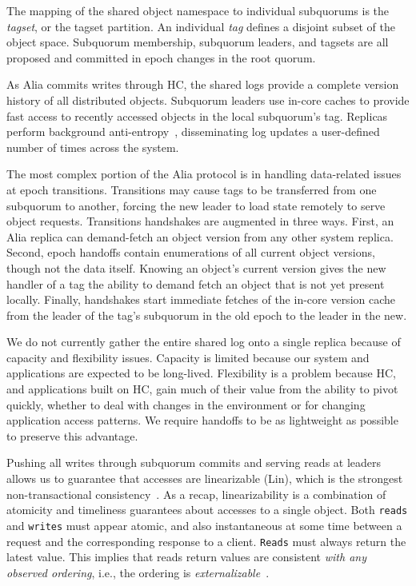 \documentclass[letterpaper,10pt,twocolumn]{article}
\newcommand{\sub}{subquorum\xspace}
\newcommand{\Sub}{Subquorum\xspace}
\newcommand{\subs}{subquorums\xspace}
\newcommand{\sys}{Alia\xspace}
\newcommand{\roo}{root quorum\xspace}
\begin{document}
The mapping of the shared object namespace to individual \subs is the
\emph{tagset}, or the tagset partition.
An individual \emph{tag} defines a disjoint subset of the object space.
\Sub membership, \sub leaders, and tagsets are all proposed and committed in
epoch changes in the \roo.

As \sys commits writes through HC, the shared logs provide a complete version
history of all distributed objects.
\Sub leaders use in-core caches to provide fast access to recently accessed
objects in the local \sub's tag.
Replicas perform background anti-entropy~\cite{dynamo,bayou,bayou2}, disseminating
log updates a
user-defined number of times across the system.

The most complex portion of the \sys protocol is in handling data-related
issues at epoch transitions.
Transitions may cause tags to be transferred from one \sub to another, forcing
the new leader to load state remotely to serve object
requests.
Transitions handshakes are augmented in three ways.
First, an \sys replica can demand-fetch an object version from any other
system replica.
Second, epoch handoffs contain enumerations of all current object versions,
though not the data itself.
Knowing an object's current version gives the new handler of a tag the ability
to demand fetch an object that is not yet present locally.
Finally, handshakes start immediate fetches of the in-core version cache from
the leader of the tag's \sub in the old epoch to the leader in the new.

We do not currently gather the entire shared log onto a single replica because
of capacity and flexibility issues.
Capacity is limited because our system and applications are expected to be
long-lived.
Flexibility is a problem because HC, and applications built on HC, gain much
of their value from the ability to pivot quickly, whether to deal with changes in the
environment or for changing application access patterns.
We require handoffs to be as lightweight as possible to preserve this
advantage.

Pushing all writes through \sub commits and serving reads at leaders allows us
to guarantee that accesses are linearizable (Lin), which is the
strongest non-transactional
consistency~\cite{linearizability,attiya_sequential_1994}.
As a recap, linearizability is a combination of atomicity and timeliness
guarantees about accesses to a single object.
Both \texttt{reads} and \texttt{writes} must appear atomic, and also instantaneous at some time between
a request and the corresponding response to a client.
\texttt{Reads} must always return the latest value.
This implies that reads return values are consistent \emph{with any observed
ordering}, i.e., the ordering is \emph{externalizable}~\cite{externalizable}.
\end{document}
